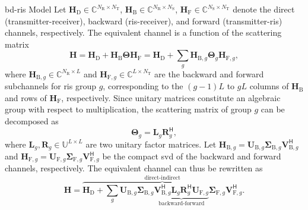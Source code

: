\documentclass[journal]{IEEEtran}
\begin{document}
\begin{section}{\gls{bd}-\gls{ris} Model}
	Let $\mathbf{H}_\mathrm{D} \in \mathbb{C}^{N_\mathrm{R} \times N_\mathrm{T}}$, $\mathbf{H}_\mathrm{B} \in \mathbb{C}^{N_\mathrm{R} \times N_\mathrm{S}}$, $\mathbf{H}_\mathrm{F} \in \mathbb{C}^{N_\mathrm{S} \times N_\mathrm{T}}$ denote the direct (transmitter-receiver), backward (\gls{ris}-receiver), and forward (transmitter-\gls{ris}) channels, respectively.
	The equivalent channel is a function of the scattering matrix
	\begin{equation}
		\mathbf{H} = \mathbf{H}_\mathrm{D} + \mathbf{H}_\mathrm{B} \mathbf{\Theta} \mathbf{H}_\mathrm{F} = \mathbf{H}_\mathrm{D} + \sum_g \mathbf{H}_{\mathrm{B},g} \mathbf{\Theta}_g \mathbf{H}_{\mathrm{F},g},
		\label{eq:channel_equivalent}
	\end{equation}
	where $\mathbf{H}_{\mathrm{B},g} \in \mathbb{C}^{N_\mathrm{R} \times L}$ and $\mathbf{H}_{\mathrm{F},g} \in \mathbb{C}^{L \times N_\mathrm{T}}$ are the backward and forward subchannels for \gls{ris} group $g$, corresponding to the $(g-1)L$ to $gL$ columns of $\mathbf{H}_\mathrm{B}$ and rows of $\mathbf{H}_\mathrm{F}$, respectively.
	Since unitary matrices constitute an algebraic group with respect to multiplication, the scattering matrix of group $g$ can be decomposed as
	\begin{equation}
		\mathbf{\Theta}_g = \mathbf{L}_g \mathbf{R}_g^\mathsf{H},
	\end{equation}
	where $\mathbf{L}_g, \mathbf{R}_g \in \mathbb{U}^{L \times L}$ are two unitary factor matrices.
	Let $\mathbf{H}_{\mathrm{B},g} = \mathbf{U}_{\mathrm{B},g} \mathbf{\Sigma}_{\mathrm{B},g} \mathbf{V}_{\mathrm{B},g}^\mathsf{H}$ and $\mathbf{H}_{\mathrm{F},g} = \mathbf{U}_{\mathrm{F},g} \mathbf{\Sigma}_{\mathrm{F},g} \mathbf{V}_{\mathrm{F},g}^\mathsf{H}$ be the compact \gls{svd} of the backward and forward channels, respectively.
	The equivalent channel can thus be rewritten as
	\begin{equation}
		\mathbf{H} = \overbrace{\mathbf{H}_\mathrm{D} + \sum_g \mathbf{U}_{\mathrm{B},g} \mathbf{\Sigma}_{\mathrm{B},g} \underbrace{\mathbf{V}_{\mathrm{B},g}^\mathsf{H} \mathbf{L}_g \mathbf{R}_g^\mathsf{H} \mathbf{U}_{\mathrm{F},g}}_\text{backward-forward} \mathbf{\Sigma}_{\mathrm{F},g} \mathbf{V}_{\mathrm{F},g}^\mathsf{H}}^\text{direct-indirect}.
		\label{eq:channel_equivalent_svd}
	\end{equation}


\end{section}
\end{document}

